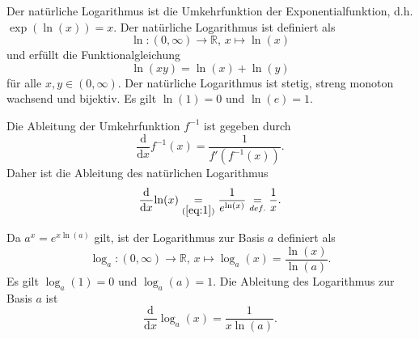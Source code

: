 \documentclass[12pt]{article}
\newcommand{\ddx}{\frac{\mathrm{d}}{\mathrm{d}x}}
\newcommand{\R}{\mathbb{R}} %
\newenvironment{definition}[2][Definition]{\begin{trivlist}
        \item[\hskip \labelsep {\bfseries #1}\hskip \labelsep {\bfseries #2.}]}{\flushright{$\square$}\end{trivlist}}
\newenvironment{remark}[2][Bemerkung]{\begin{trivlist}
        \item[\hskip \labelsep {\bfseries #1}\hskip \labelsep {\bfseries #2.}]}{\end{trivlist}}
\begin{document}
\begin{definition}{[Logarithmus]}
        Der natürliche Logarithmus ist die Umkehrfunktion der Exponentialfunktion, d.h. $\exp(\ln(x))=x$.
        Der natürliche Logarithmus ist definiert als
        \begin{equation}
                \ln: \left(0,\infty\right)\to\R,\,x\mapsto\ln(x)
        \end{equation}
        und erfüllt die Funktionalgleichung
        \begin{equation}
                \ln(xy)=\ln(x)+\ln(y)
        \end{equation}
        für alle $x,y\in\left(0,\infty\right)$. Der natürliche Logarithmus ist stetig, streng monoton wachsend und bijektiv. Es gilt $\ln(1)=0$ und $\ln(e)=1$.

        \begin{remark}{[Ableitung des Logarithmus]}
                Die Ableitung der Umkehrfunktion $f^{-1}$ ist gegeben durch
                \begin{equation}\label{eq:1}
                        \ddx{f^{-1}(x)}=\frac{1}{f'(f^{-1}(x))}.
                \end{equation}
                Daher ist die Ableitung des natürlichen Logarithmus
                \begin{equation}
                        \ddx{\ln(x)}\underset{(\ref{eq:1})}{=}\frac{1}{e^{\ln(x)}}\underset{def.}{=}\frac{1}{x}.
                \end{equation}
        \end{remark}

        \begin{remark}{[Logarithmus zur Basis $a$]}
                Da $a^x=e^{x\ln(a)}$ gilt, ist der Logarithmus zur Basis $a$ definiert als
                \begin{equation}
                        \log_a: \left(0,\infty\right)\to\R,\,x\mapsto\log_a(x)=\frac{\ln(x)}{\ln(a)}.
                \end{equation}
                Es gilt $\log_a(1)=0$ und $\log_a(a)=1$. Die Ableitung des Logarithmus zur Basis $a$ ist
                \begin{equation}
                        \ddx{\log_a(x)}=\frac{1}{x\ln(a)}.
                \end{equation}
        \end{remark}
\end{definition}
\end{document}
